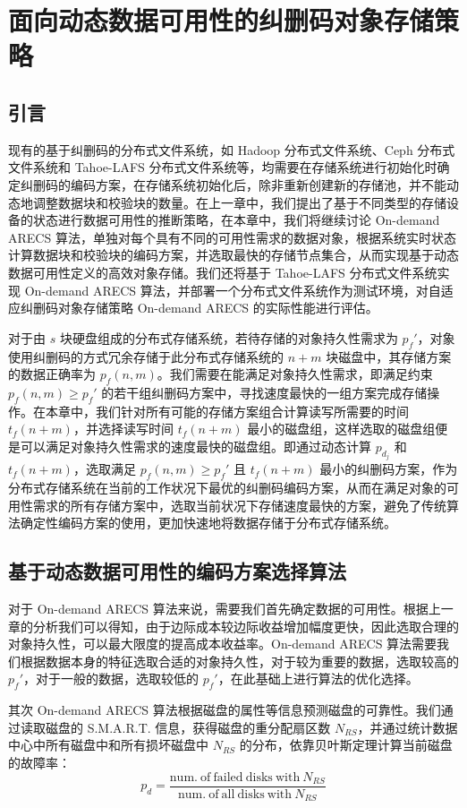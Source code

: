 \chapter{面向动态数据可用性的纠删码对象存储策略}
\section{引言}
现有的基于纠删码的分布式文件系统，如 Hadoop 分布式文件系统、Ceph 分布式文件系统和 Tahoe-LAFS 分布式文件系统等，均需要在存储系统进行初始化时确定纠删码的编码方案，在存储系统初始化后，除非重新创建新的存储池，并不能动态地调整数据块和校验块的数量。在上一章中，我们提出了基于不同类型的存储设备的状态进行数据可用性的推断策略，在本章中，我们将继续讨论 On-demand ARECS 算法，单独对每个具有不同的可用性需求的数据对象，根据系统实时状态计算数据块和校验块的编码方案，并选取最快的存储节点集合，从而实现基于动态数据可用性定义的高效对象存储。我们还将基于 Tahoe-LAFS 分布式文件系统实现 On-demand ARECS 算法，并部署一个分布式文件系统作为测试环境，对自适应纠删码对象存储策略 On-demand ARECS 的实际性能进行评估。

对于由 $s$ 块硬盘组成的分布式存储系统，若待存储的对象持久性需求为 $p_{f}'$，对象使用纠删码的方式冗余存储于此分布式存储系统的 $n+m$ 块磁盘中，其存储方案的数据正确率为 $p_{f}(n,m)$。我们需要在能满足对象持久性需求，即满足约束 $p_{f}(n,m) \geq p_{f}'$ 的若干组纠删码方案中，寻找速度最快的一组方案完成存储操作。在本章中，我们针对所有可能的存储方案组合计算读写所需要的时间 $t_{f}(n+m)$，并选择读写时间 $t_{f}(n+m)$ 最小的磁盘组，这样选取的磁盘组便是可以满足对象持久性需求的速度最快的磁盘组。即通过动态计算 $p_{d_j}$ 和 $t_{f}(n+m)$，选取满足 $p_{f}(n,m) \geq p_{f}'$ 且 $t_{f}(n+m)$ 最小的纠删码方案，作为分布式存储系统在当前的工作状况下最优的纠删码编码方案，从而在满足对象的可用性需求的所有存储方案中，选取当前状况下存储速度最快的方案，避免了传统算法确定性编码方案的使用，更加快速地将数据存储于分布式存储系统。
\section{基于动态数据可用性的编码方案选择算法}
对于 On-demand ARECS 算法来说，需要我们首先确定数据的可用性。根据上一章的分析我们可以得知，由于边际成本较边际收益增加幅度更快，因此选取合理的对象持久性，可以最大限度的提高成本收益率。On-demand ARECS 算法需要我们根据数据本身的特征选取合适的对象持久性，对于较为重要的数据，选取较高的 $p_{f}'$，对于一般的数据，选取较低的 $p_{f}'$，在此基础上进行算法的优化选择。

其次 On-demand ARECS 算法根据磁盘的属性等信息预测磁盘的可靠性。我们通过读取磁盘的 S.M.A.R.T. 信息，获得磁盘的重分配扇区数 $N_{RS}$，并通过统计数据中心中所有磁盘中和所有损坏磁盘中 $N_{RS}$ 的分布，依靠贝叶斯定理计算当前磁盘的故障率：
\begin{equation}
p_d=\dfrac{\mathrm{num.\ of\ failed\ disks\ with\ }N_{RS}}{\mathrm{num.\ of\ all\ disks\ with\ }N_{RS}}
\end{equation}


